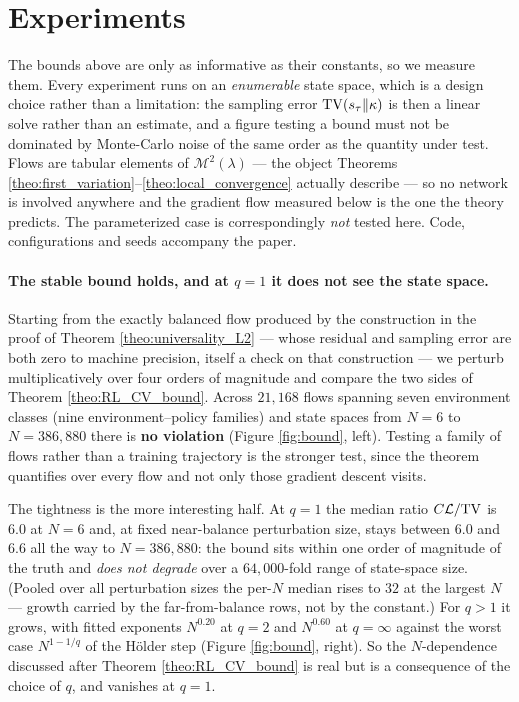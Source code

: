 \section{Experiments}\label{sec:experiments}

The bounds above are only as informative as their constants, so we measure them. Every
experiment runs on an \emph{enumerable} state space, which is a design choice rather than a
limitation: the sampling error $\mathrm{TV}(s_\tau\|\kappa)$ is then a linear solve rather than an
estimate, and a figure testing a bound must not be dominated by Monte-Carlo noise of the same
order as the quantity under test. Flows are tabular elements of $\mathcal M^2(\lambda)$
--- the object Theorems \ref{theo:first_variation}--\ref{theo:local_convergence} actually
describe --- so no network is involved anywhere and the gradient flow measured below is the
one the theory predicts. The parameterized case is correspondingly \emph{not} tested here.
Code, configurations and seeds accompany the paper.

\paragraph{The stable bound holds, and at $q=1$ it does not see the state space.}
Starting from the exactly balanced flow produced by the construction in the proof of Theorem
\ref{theo:universality_L2} --- whose residual and sampling error are both zero to machine
precision, itself a check on that construction --- we perturb multiplicatively over four
orders of magnitude and compare the two sides of Theorem \ref{theo:RL_CV_bound}. Across
$21{,}168$ flows spanning seven environment classes (nine environment--policy families)
and state spaces from $N=6$ to
$N=386{,}880$ there is \textbf{no violation} (Figure \ref{fig:bound}, left). Testing a family
of flows rather than a training trajectory is the stronger test, since the theorem quantifies
over every flow and not only those gradient descent visits.

The tightness is the more interesting half. At $q=1$ the median ratio
$C\mathcal L/\mathrm{TV}$ is $6.0$ at $N=6$ and, at fixed near-balance perturbation size, stays
between $6.0$ and $6.6$ all the way to $N=386{,}880$: the bound sits within one
order of magnitude of the truth and \emph{does not degrade} over a $64{,}000$-fold range of
state-space size. (Pooled over all perturbation sizes the per-$N$ median rises to $32$ at
the largest $N$ --- growth carried by the far-from-balance rows, not by the constant.)
For $q>1$ it grows, with fitted exponents $N^{0.20}$ at $q=2$ and $N^{0.60}$
at $q=\infty$ against the worst case $N^{1-1/q}$ of the H\"older step (Figure \ref{fig:bound},
right). So the $N$-dependence discussed after Theorem \ref{theo:RL_CV_bound} is real but is a
consequence of the choice of $q$, and vanishes at $q=1$.

